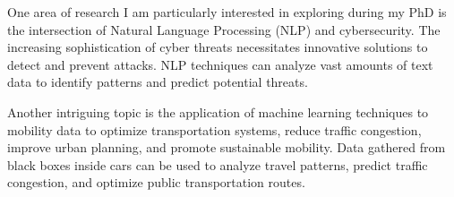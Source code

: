 One area of research I am particularly interested in exploring during my PhD is the intersection of Natural Language Processing (NLP) and cybersecurity. The increasing sophistication of cyber threats necessitates innovative solutions to detect and prevent attacks. NLP techniques can analyze vast amounts of text data to identify patterns and predict potential threats.

Another intriguing topic is the application of machine learning techniques to mobility data to optimize transportation systems, reduce traffic congestion, improve urban planning, and promote sustainable mobility. Data gathered from black boxes inside cars can be used to analyze travel patterns, predict traffic congestion, and optimize public transportation routes.

\iffalse
I am especially interested in exploring how pre-trained LLM models, such as BERT and GPT, can be adapted to cybersecurity applications. For example, these models could be fine-tuned and possibly enhanced through a Retrieval-Augmented Generation (RAG) architecture to detect and respond to cyber threats in real-time, identify security bugs in codebases, or analyze logs for anomalous behavior.
\fi
